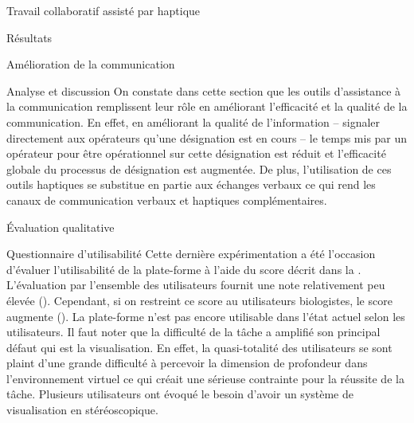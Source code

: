 \documentclass[myfrancais,ngerman,english,frenchb]{mythesis}
\begin{document}
\begin{mychapter}{Travail collaboratif assisté par haptique}
\begin{mysection}{Résultats}
\begin{mysubsection}{Amélioration de la communication}
\begin{mysubsubsection}{Analyse et discussion}
					On constate dans cette section que les outils d'assistance à la communication remplissent leur rôle en améliorant l'efficacité et la qualité de la communication.
					En effet, en améliorant la qualité de l'information -- signaler directement aux opérateurs qu'une désignation est en cours -- le temps mis par un opérateur pour être opérationnel sur cette désignation est réduit et l'efficacité globale du processus de désignation est augmentée.
					De plus, l'utilisation de ces outils haptiques se substitue en partie aux échanges verbaux ce qui rend les canaux de communication verbaux et haptiques complémentaires.
				\end{mysubsubsection}
			\end{mysubsection}
			\begin{mysubsection}{Évaluation qualitative}
				\begin{mysubsubsection}{Questionnaire d'utilisabilité}
					Cette dernière expérimentation a été l'occasion d'évaluer l'utilisabilité de la plate-forme \myShaddock à l'aide du score  décrit dans la .
					L'évaluation par l'ensemble des utilisateurs fournit une note relativement peu élevée ().
					Cependant, si on restreint ce score au utilisateurs biologistes, le score augmente ().
					La plate-forme n'est pas encore utilisable dans l'état actuel selon les utilisateurs.
					Il faut noter que la difficulté de la tâche a amplifié son principal défaut qui est la visualisation.
					En effet, la quasi-totalité des utilisateurs se sont plaint d'une grande difficulté à percevoir la dimension de profondeur dans l'environnement virtuel ce qui créait une sérieuse contrainte pour la réussite de la tâche.
					Plusieurs utilisateurs ont évoqué le besoin d'avoir un système de visualisation en \myThreeD stéréoscopique.


\end{mysubsubsection}
\end{mysubsection}
\end{mysection}
\end{mychapter}
\end{document}
